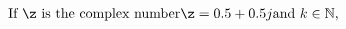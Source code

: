 \documentclass[preview]{standalone}
\begin{document}
\begin{align*}
\text{If } \z \text{ is the complex number} \z = 0.5 + 0.5j \text{and $k \in \mathbb{N}$, }
\end{align*}
\end{document}
